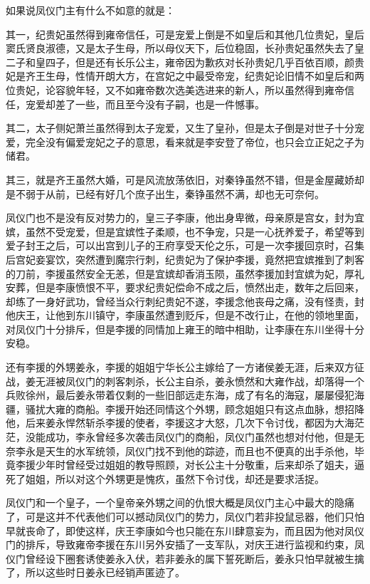 如果说凤仪门主有什么不如意的就是：

其一，纪贵妃虽然得到雍帝信任，可是宠爱上倒是不如皇后和其他几位贵妃，皇后窦氏贤良淑德，又是太子生母，所以母仪天下，后位稳固，长孙贵妃虽然失去了皇二子和皇四子，但是还有长乐公主，雍帝因为歉疚对长孙贵妃几乎百依百顺，颜贵妃是齐王生母，性情开朗大方，在宫妃之中最受帝宠，纪贵妃论旧情不如皇后和两位贵妃，论容貌年轻，又不如雍帝数次选美选进来的新人，所以虽然得到雍帝信任，宠爱却差了一些，而且至今没有子嗣，也是一件憾事。

其二，太子侧妃萧兰虽然得到太子宠爱，又生了皇孙，但是太子倒是对世子十分宠爱，完全没有偏爱宠妃之子的意思，看来就是李安登了帝位，也只会立正妃之子为储君。

其三，就是齐王虽然大婚，可是风流放荡依旧，对秦铮虽然不错，但是金屋藏娇却是不弱于从前，已经有好几个庶子出生，秦铮虽然不满，却也无可奈何。

凤仪门也不是没有反对势力的，皇三子李康，他出身卑微，母亲原是宫女，封为宜嫔，虽然不受宠爱，但是宜嫔性子柔顺，也不争宠，只是一心抚养爱子，希望等到爱子封王之后，可以出宫到儿子的王府享受天伦之乐，可是一次李援回京时，召集后宫妃妾宴饮，突然遭到魔宗行刺，纪贵妃为了保护李援，竟然把宜嫔推到了刺客的刀前，李援虽然安全无恙，但是宜嫔却香消玉陨，虽然李援加封宜嫔为妃，厚礼安葬，但是李康愤恨不平，要求纪贵妃偿命不成之后，愤然出走，数年之后回来，却练了一身好武功，曾经当众行刺纪贵妃不遂，李援念他丧母之痛，没有怪责，封他庆王，让他到东川镇守，李康虽然遭到贬斥，但是不改行止，在他的领地里面，对凤仪门十分排斥，但是李援的同情加上雍王的暗中相助，让李康在东川坐得十分安稳。

还有李援的外甥姜永，李援的姐姐宁华长公主嫁给了一方诸侯姜无涯，后来双方征战，姜无涯被凤仪门的刺客刺杀，长公主自杀，姜永愤然和大雍作战，却落得一个兵败徐州，最后姜永带着仅剩的一些旧部远走东海，成了有名的海寇，屡屡侵犯海疆，骚扰大雍的商船。李援开始还同情这个外甥，顾念姐姐只有这点血脉，想招降他，后来姜永悍然斩杀李援的使者，李援这才大怒，几次下令讨伐，都因为大海茫茫，没能成功，李永曾经多次袭击凤仪门的商船，凤仪门虽然也想对付他，但是无奈李永是天生的水军统领，凤仪门找不到他的踪迹，而且也不便真的出手杀他，毕竟李援少年时曾经受过姐姐的教导照顾，对长公主十分敬重，后来却杀了姐夫，逼死了姐姐，所以对这个外甥更是愧疚，虽然下令讨伐，却还是要求活捉。

凤仪门和一个皇子，一个皇帝亲外甥之间的仇恨大概是凤仪门主心中最大的隐痛了，可是这并不代表他们可以撼动凤仪门的势力，凤仪门若非投鼠忌器，他们只怕早就丧命了，即使这样，庆王李康如今也只能在东川肆意妄为，而且因为他对凤仪门的排斥，导致雍帝李援在东川另外安插了一支军队，对庆王进行监视和约束，凤仪门曾经设下圈套诱使姜永入伏，若非姜永的属下誓死断后，姜永只怕早就被生擒了，所以这些时日姜永已经销声匿迹了。

